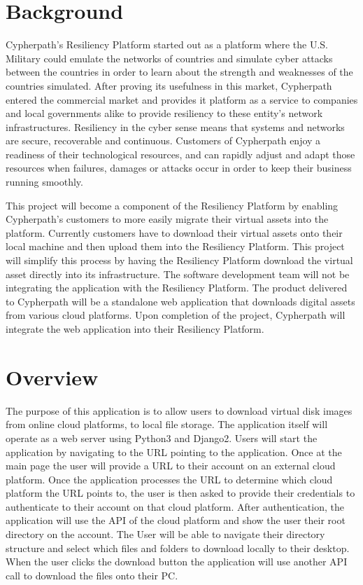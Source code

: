 \documentclass{article}
\begin{document}
    \section{Background}
    Cypherpath's Resiliency Platform started out as a platform where the U.S. Military could emulate the networks of countries and simulate cyber attacks between the countries in order to
    learn about the strength and weaknesses of the countries simulated. After proving its usefulness in this market, Cypherpath entered the commercial market and provides it platform as a service to
    companies and local governments alike to provide resiliency to these entity's network infrastructures. Resiliency in the cyber sense means that systems and networks are secure, recoverable and
    continuous. Customers of Cypherpath enjoy a readiness of their technological resources, and can rapidly adjust and adapt those resources when failures, damages or attacks occur in order to keep their business running smoothly.

    This project will become a component of the Resiliency Platform by enabling Cypherpath's customers to more easily migrate their virtual assets into the platform. Currently customers have to download
    their virtual assets onto their local machine and then upload them into the Resiliency Platform. This project will simplify this process by having the Resiliency Platform download the virtual asset directly
    into its infrastructure. The software development team will not be integrating the application with the Resiliency Platform. The product delivered to Cypherpath will be a standalone web application that downloads
    digital assets from various cloud platforms. Upon completion of the project, Cypherpath will integrate the web application into their Resiliency Platform.


	
    \section{Overview}
    The purpose of this application is to allow users to download virtual disk images from online cloud platforms, to local file storage.
    The application itself will operate as a web server using Python3 and Django2. Users will start the application by navigating to the URL pointing to the application.
    Once at the main page the user will
    provide a URL to their account on an external cloud platform. Once the application processes the URL to determine which cloud platform the URL points to, the user is
    then asked to provide their credentials to authenticate
    to their account on that cloud platform. After authentication, the application will use the API of the cloud platform and show the user their root directory on the account.
    The User will be able to navigate their directory structure and select which files and folders to download locally to their desktop.
    When the user clicks the download button the application will use another API call to download the files onto their PC.
\end{document}

